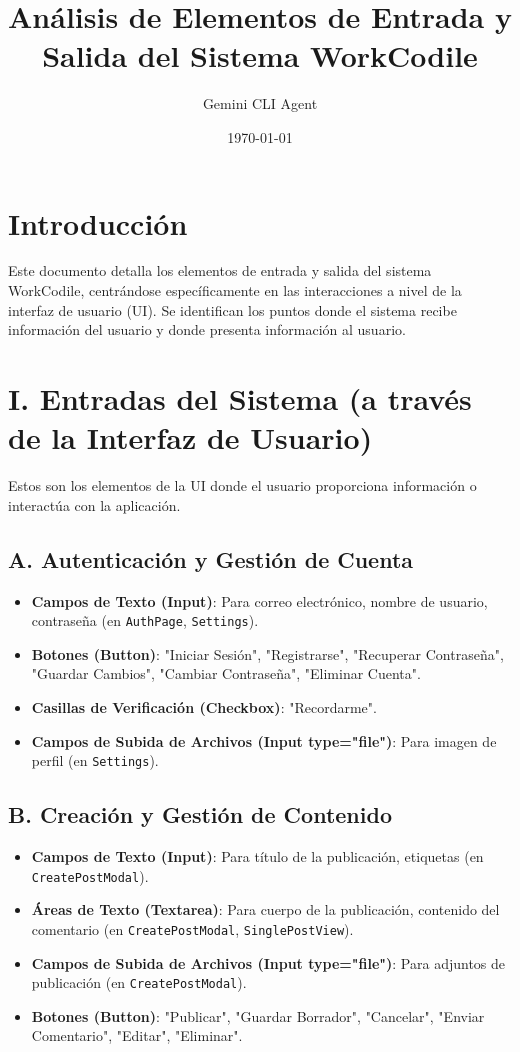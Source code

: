 \documentclass{article}
\title{Análisis de Elementos de Entrada y Salida del Sistema WorkCodile}
\author{Gemini CLI Agent}
\date{\today}
\begin{document}
\maketitle

\section*{Introducción}
Este documento detalla los elementos de entrada y salida del sistema WorkCodile, centrándose específicamente en las interacciones a nivel de la interfaz de usuario (UI). Se identifican los puntos donde el sistema recibe información del usuario y donde presenta información al usuario.

\section*{I. Entradas del Sistema (a través de la Interfaz de Usuario)}
Estos son los elementos de la UI donde el usuario proporciona información o interactúa con la aplicación.

\subsection*{A. Autenticación y Gestión de Cuenta}
\begin{itemize}
    \item \textbf{Campos de Texto (Input)}: Para correo electrónico, nombre de usuario, contraseña (en \texttt{AuthPage}, \texttt{Settings}).
    \item \textbf{Botones (Button)}: "Iniciar Sesión", "Registrarse", "Recuperar Contraseña", "Guardar Cambios", "Cambiar Contraseña", "Eliminar Cuenta".
    \item \textbf{Casillas de Verificación (Checkbox)}: "Recordarme".
    \item \textbf{Campos de Subida de Archivos (Input type="file")}: Para imagen de perfil (en \texttt{Settings}).
\end{itemize}

\subsection*{B. Creación y Gestión de Contenido}
\begin{itemize}
    \item \textbf{Campos de Texto (Input)}: Para título de la publicación, etiquetas (en \texttt{CreatePostModal}).
    \item \textbf{Áreas de Texto (Textarea)}: Para cuerpo de la publicación, contenido del comentario (en \texttt{CreatePostModal}, \texttt{SinglePostView}).
    \item \textbf{Campos de Subida de Archivos (Input type="file")}: Para adjuntos de publicación (en \texttt{CreatePostModal}).
    \item \textbf{Botones (Button)}: "Publicar", "Guardar Borrador", "Cancelar", "Enviar Comentario", "Editar", "Eliminar".
\end{itemize}
\end{document}

